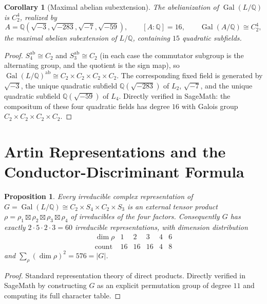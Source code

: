 \documentclass[12pt]{amsart}
\newtheorem{proposition}[theorem]{Proposition}
\newtheorem{corollary}[theorem]{Corollary}
\DeclareMathOperator{\Gal}{Gal}
\newcommand{\Q}{\mathbb{Q}}
\begin{document}
\begin{corollary}[Maximal abelian subextension]\label{cor:abelian}
The abelianization of $\Gal(L/\Q)$ is $C_2^4$, realized by
\[
A=\Q(\sqrt{-3},\sqrt{-283},\sqrt{-7},\sqrt{-59}),\qquad
[A:\Q]=16,\qquad \Gal(A/\Q)\cong C_2^4,
\]
the maximal abelian subextension of $L/\Q$, containing $15$ quadratic
subfields.
\end{corollary}
\begin{proof}
$S_4^{\mathrm{ab}}\cong C_2$ and $S_3^{\mathrm{ab}}\cong C_2$ (in each
case the commutator subgroup is the alternating group, and the quotient
is the sign map), so
$\Gal(L/\Q)^{\mathrm{ab}}\cong C_2\times C_2\times C_2\times C_2$. The
corresponding fixed field is generated by $\sqrt{-3}$, the unique
quadratic subfield $\Q(\sqrt{-283})$ of $L_2$, $\sqrt{-7}$, and the
unique quadratic subfield $\Q(\sqrt{-59})$ of $L_4$. Directly verified in
SageMath: the compositum of these four quadratic fields has degree $16$
with Galois group $C_2\times C_2\times C_2\times C_2$.
\end{proof}

\section{Artin Representations and the Conductor-Discriminant
Formula}\label{sec:artin}

\begin{proposition}\label{prop:artin-count}
Every irreducible complex representation of
$G=\Gal(L/\Q)\cong C_2\times S_4\times C_2\times S_3$ is an external
tensor product $\rho=\rho_1\boxtimes\rho_2\boxtimes\rho_3\boxtimes\rho_4$
of irreducibles of the four factors. Consequently $G$ has exactly
$2\cdot5\cdot2\cdot3=60$ irreducible representations, with dimension
distribution
\[
\begin{array}{c|ccccc}
\dim\rho & 1 & 2 & 3 & 4 & 6\\\hline
\text{count} & 16 & 16 & 16 & 4 & 8
\end{array}
\]
and $\sum_{\rho}(\dim\rho)^2=576=|G|$.
\end{proposition}
\begin{proof}
Standard representation theory of direct products. Directly verified in
SageMath by constructing $G$ as an explicit permutation group of degree
$11$ and computing its full character table.
\end{proof}
\end{document}
